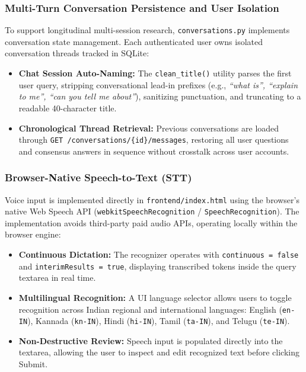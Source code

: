 \subsubsection{Multi-Turn Conversation Persistence and User Isolation}
To support longitudinal multi-session research, \texttt{conversations.py} implements conversation state management. Each authenticated user owns isolated conversation threads tracked in SQLite:
\begin{itemize}
    \item \textbf{Chat Session Auto-Naming:} The \texttt{clean\_title()} utility parses the first user query, stripping conversational lead-in prefixes (e.g., \emph{``what is'', ``explain to me'', ``can you tell me about''}), sanitizing punctuation, and truncating to a readable 40-character title.
    \item \textbf{Chronological Thread Retrieval:} Previous conversations are loaded through \texttt{GET /conversations/\{id\}/messages}, restoring all user questions and consensus answers in sequence without crosstalk across user accounts.
\end{itemize}

\subsubsection{Browser-Native Speech-to-Text (STT)}
Voice input is implemented directly in \texttt{frontend/index.html} using the browser's native Web Speech API (\texttt{webkitSpeechRecognition} / \texttt{SpeechRecognition}). The implementation avoids third-party paid audio APIs, operating locally within the browser engine:
\begin{itemize}
    \item \textbf{Continuous Dictation:} The recognizer operates with \texttt{continuous = false} and \texttt{interimResults = true}, displaying transcribed tokens inside the query textarea in real time.
    \item \textbf{Multilingual Recognition:} A UI language selector allows users to toggle recognition across Indian regional and international languages: English (\texttt{en-IN}), Kannada (\texttt{kn-IN}), Hindi (\texttt{hi-IN}), Tamil (\texttt{ta-IN}), and Telugu (\texttt{te-IN}).
    \item \textbf{Non-Destructive Review:} Speech input is populated directly into the textarea, allowing the user to inspect and edit recognized text before clicking Submit.
\end{itemize}

